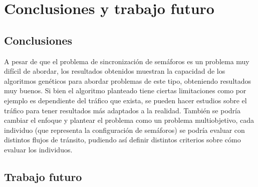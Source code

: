 \chapter{Conclusiones y trabajo futuro}

\section{Conclusiones}
A pesar de que el problema de sincronización de semáforos
es un problema muy difícil de abordar, los resultados obtenidos
muestran la capacidad de los algoritmos genéticos para abordar
problemas de este tipo, obteniendo resultados muy buenos. Si
bien el algoritmo planteado tiene ciertas limitaciones como por
ejemplo es dependiente del tráfico que exista, se pueden hacer
estudios sobre el tráfico para tener resultados más adaptados a
la realidad. También se podría cambiar el enfoque y plantear el
problema  como  un  problema  multiobjetivo,  cada  individuo
(que  representa  la  configuración  de  semáforos)  se  podría
evaluar  con  distintos  flujos  de  tránsito,  pudiendo  así  definir
distintos criterios sobre cómo evaluar los individuos.
\section{Trabajo futuro}
